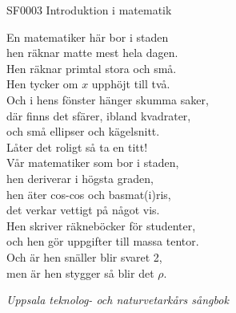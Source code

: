 \documentclass[a6paper,10pt]{article}
\begin{document}
\setlength{\oddsidemargin}{-0.47in}
\noindent
\begin{center}
\footnotesize SF0003 Introduktion i matematik\\
\end{center}
En matematiker här bor i staden \\
hen räknar matte mest hela dagen. \\
Hen räknar primtal stora och små. \\
Hen tycker om $x$ upphöjt till två. \\
Och i hens fönster hänger skumma saker, \\
där finns det sfärer, ibland kvadrater, \\
och små ellipser och kägelsnitt. \\
Låter det roligt så ta en titt! 
\vspace{5pt} \\
Vår matematiker som bor i staden, \\
hen deriverar i högsta graden, \\
hen äter cos-cos och basmat(i)ris, \\
det verkar vettigt på något vis. \\
Hen skriver räkneböcker för studenter, \\
och hen gör uppgifter till massa tentor. \\
Och är hen snäller blir svaret 2, \\
men är hen stygger så blir det $\rho$. 
\begin{flushright}
\textit{Uppsala teknolog- och naturvetarkårs sångbok}
\end{flushright}
\end{document}
